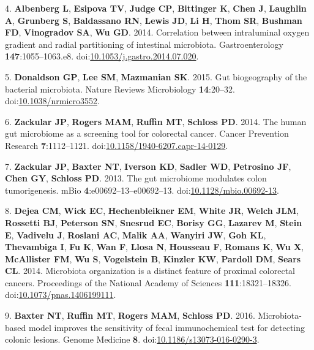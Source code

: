 \documentclass[11pt,]{article}
\begin{document}
\hypertarget{ref-Albenberg2014}{}
4. \textbf{Albenberg L}, \textbf{Esipova TV}, \textbf{Judge CP},
\textbf{Bittinger K}, \textbf{Chen J}, \textbf{Laughlin A},
\textbf{Grunberg S}, \textbf{Baldassano RN}, \textbf{Lewis JD},
\textbf{Li H}, \textbf{Thom SR}, \textbf{Bushman FD}, \textbf{Vinogradov
SA}, \textbf{Wu GD}. 2014. Correlation between intraluminal oxygen
gradient and radial partitioning of intestinal microbiota.
Gastroenterology \textbf{147}:1055--1063.e8.
doi:\href{https://doi.org/10.1053/j.gastro.2014.07.020}{10.1053/j.gastro.2014.07.020}.

\hypertarget{ref-Donaldson2015}{}
5. \textbf{Donaldson GP}, \textbf{Lee SM}, \textbf{Mazmanian SK}. 2015.
Gut biogeography of the bacterial microbiota. Nature Reviews
Microbiology \textbf{14}:20--32.
doi:\href{https://doi.org/10.1038/nrmicro3552}{10.1038/nrmicro3552}.

\hypertarget{ref-Zackular2014}{}
6. \textbf{Zackular JP}, \textbf{Rogers MAM}, \textbf{Ruffin MT},
\textbf{Schloss PD}. 2014. The human gut microbiome as a screening tool
for colorectal cancer. Cancer Prevention Research \textbf{7}:1112--1121.
doi:\href{https://doi.org/10.1158/1940-6207.capr-14-0129}{10.1158/1940-6207.capr-14-0129}.

\hypertarget{ref-Zackular2013}{}
7. \textbf{Zackular JP}, \textbf{Baxter NT}, \textbf{Iverson KD},
\textbf{Sadler WD}, \textbf{Petrosino JF}, \textbf{Chen GY},
\textbf{Schloss PD}. 2013. The gut microbiome modulates colon
tumorigenesis. mBio \textbf{4}:e00692--13--e00692--13.
doi:\href{https://doi.org/10.1128/mbio.00692-13}{10.1128/mbio.00692-13}.

\hypertarget{ref-Dejea2014}{}
8. \textbf{Dejea CM}, \textbf{Wick EC}, \textbf{Hechenbleikner EM},
\textbf{White JR}, \textbf{Welch JLM}, \textbf{Rossetti BJ},
\textbf{Peterson SN}, \textbf{Snesrud EC}, \textbf{Borisy GG},
\textbf{Lazarev M}, \textbf{Stein E}, \textbf{Vadivelu J},
\textbf{Roslani AC}, \textbf{Malik AA}, \textbf{Wanyiri JW}, \textbf{Goh
KL}, \textbf{Thevambiga I}, \textbf{Fu K}, \textbf{Wan F}, \textbf{Llosa
N}, \textbf{Housseau F}, \textbf{Romans K}, \textbf{Wu X},
\textbf{McAllister FM}, \textbf{Wu S}, \textbf{Vogelstein B},
\textbf{Kinzler KW}, \textbf{Pardoll DM}, \textbf{Sears CL}. 2014.
Microbiota organization is a distinct feature of proximal colorectal
cancers. Proceedings of the National Academy of Sciences
\textbf{111}:18321--18326.
doi:\href{https://doi.org/10.1073/pnas.1406199111}{10.1073/pnas.1406199111}.

\hypertarget{ref-Baxter2016}{}
9. \textbf{Baxter NT}, \textbf{Ruffin MT}, \textbf{Rogers MAM},
\textbf{Schloss PD}. 2016. Microbiota-based model improves the
sensitivity of fecal immunochemical test for detecting colonic lesions.
Genome Medicine \textbf{8}.
doi:\href{https://doi.org/10.1186/s13073-016-0290-3}{10.1186/s13073-016-0290-3}.
\end{document}
